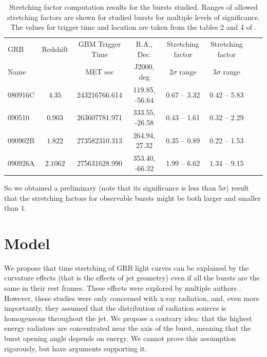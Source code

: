 \documentclass[11pt,a4paper]{article}
\begin{document}
\begin{table}
	\centering
	\small
	\begin{tabular}{ l | c | c | c | c | c | c | c}
		GRB 	& 	Redshift	&	GBM Trigger Time	& R.A., Dec.			&	Stretching factor	&	Stretching factor	\\
		Name 	& 				&	MET sec				& J2000, deg			&	$2\sigma$ range		&	$3\sigma$ range		\\
		\hline
		080916C	&	$4.35$		&	243216766.614		&	119.85,	-56.64 		&	0.67 -- 3.32		&	0.42 -- 5.83		\\
		090510 	&	$0.903$		&	263607781.971		&	333.55, -26.58		&	0.43 -- 1.61		&	0.32 -- 2.29		\\
		090902B	&	$1.822$		&	273582310.313		&	264.94,  27.32		&	0.35 -- 0.89		&	0.22 -- 1.53		\\
		090926A	&	$2.1062$	&	275631628.990		&	353.40, -66.32 		&	1.99 -- 6.62		&	1.34 -- 9.15		\\
	\end{tabular}
	\caption{
		Stretching factor computation results for the bursts studied. Ranges of allowed stretching factors are shown for studied bursts for multiple levels of significance.
		The values for trigger time and location are taken from the tables 2 and 4 of \cite{Ackermann:2013zfa}.
	}
	\label{tab:bursts}
\end{table}

So we obtained a preliminary (note that its significance is less than $5\sigma$) result that the stretching factors for observable bursts might be both larger and smaller than $1$.

\section{Model}
\label{sec:model}

We propose that time stretching of GRB light curves can be explained by the curvature effects (that is the effects of jet geometry) even if all the bursts are the same in their rest frames.
These effects were explored by multiple authors \cite{Nakamura:2001kd,Shen:2005ea,Shenoy:2013cba}.
However, these studies were only concerned with x-ray radiation, and, even more importantly, they assumed that the distribution of radiation sources is homogeneous throughout the jet.
We propose a contrary idea: that the highest energy radiators are concentrated near the axis of the burst, meaning that the burst opening angle depends on energy.
We cannot prove this assumption rigorously, but have arguments supporting it.
\end{document}
